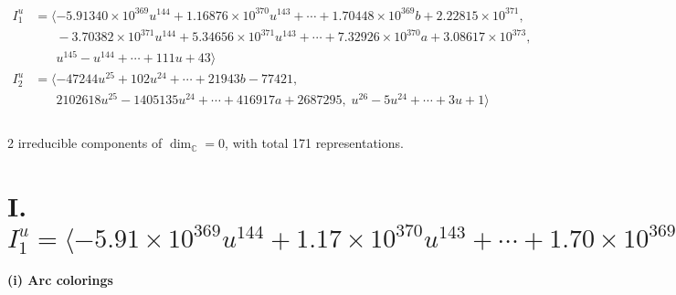 \documentclass[1p]{elsarticle_modified}
\theoremstyle{definition}
\begin{document}
\begin{align*}
I^u_{1}&=\langle 
-5.91340\times10^{369} u^{144}+1.16876\times10^{370} u^{143}+\cdots+1.70448\times10^{369} b+2.22815\times10^{371},\\
\phantom{I^u_{1}}&\phantom{= \langle  }-3.70382\times10^{371} u^{144}+5.34656\times10^{371} u^{143}+\cdots+7.32926\times10^{370} a+3.08617\times10^{373},\\
\phantom{I^u_{1}}&\phantom{= \langle  }u^{145}- u^{144}+\cdots+111 u+43\rangle \\
I^u_{2}&=\langle 
-47244 u^{25}+102 u^{24}+\cdots+21943 b-77421,\\
\phantom{I^u_{2}}&\phantom{= \langle  }2102618 u^{25}-1405135 u^{24}+\cdots+416917 a+2687295,\;u^{26}-5 u^{24}+\cdots+3 u+1\rangle \\
\\
\end{align*}
\raggedright * 2 irreducible components of $\dim_{\mathbb{C}}=0$, with total 171 representations.\\
\newpage
\renewcommand{\arraystretch}{1}
\centering \section*{I. $I^u_{1}= \langle -5.91\times10^{369} u^{144}+1.17\times10^{370} u^{143}+\cdots+1.70\times10^{369} b+2.23\times10^{371},\;-3.70\times10^{371} u^{144}+5.35\times10^{371} u^{143}+\cdots+7.33\times10^{370} a+3.09\times10^{373},\;u^{145}- u^{144}+\cdots+111 u+43 \rangle$}
\flushleft \textbf{(i) Arc colorings}\\
\end{document}
